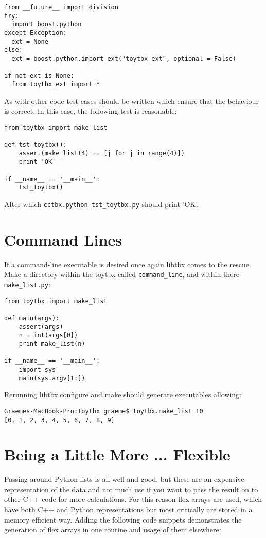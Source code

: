 \documentclass[a4paper, 11pt]{article}
\begin{document}
{\small
\begin{verbatim}
from __future__ import division
try:
  import boost.python
except Exception:
  ext = None
else:
  ext = boost.python.import_ext("toytbx_ext", optional = False)

if not ext is None:
  from toytbx_ext import *
\end{verbatim}
}

As with other code test cases should be written which ensure that the behaviour is correct. In this case, the following test is reasonable:

{\small
\begin{verbatim}
from toytbx import make_list

def tst_toytbx():
    assert(make_list(4) == [j for j in range(4)])
    print 'OK'

if __name__ == '__main__':
    tst_toytbx()
\end{verbatim}
}

After which \verb|cctbx.python tst_toytbx.py| should print 'OK'.

\section{Command Lines}

If a command-line executable is desired once again libtbx comes to the rescue. Make a directory within the toytbx called \verb|command_line|, and within there \verb|make_list.py|:

{\small
\begin{verbatim}
from toytbx import make_list

def main(args):
    assert(args)
    n = int(args[0])
    print make_list(n)

if __name__ == '__main__':
    import sys
    main(sys.argv[1:])
\end{verbatim}
}

Rerunning libtbx.configure and make should generate executables allowing:

{\small
\begin{verbatim}
Graemes-MacBook-Pro:toytbx graeme$ toytbx.make_list 10
[0, 1, 2, 3, 4, 5, 6, 7, 8, 9]
\end{verbatim}
}

\section{Being a Little More ... Flexible}

Passing around Python lists is all well and good, but these are an
expensive representation of the data and not much use if you want to
pass the result on to other C++ code for more calculations. For this
reason flex arrays are used, which have both C++ and Python
representations but most critically are stored in a memory efficient
way. Adding the following code snippets demonstrates the generation of
flex arrays in one routine and usage of them elsewhere:
\end{document}
